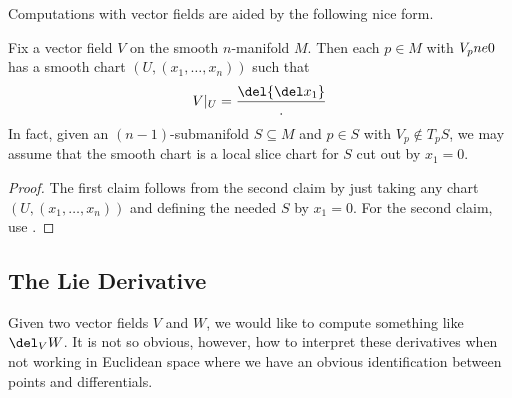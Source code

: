 \documentclass[../notes.tex]{subfiles}
\begin{document}
Computations with vector fields are aided by the following nice form.
\begin{lemma} \label{lem:get-vector-field-form}
	Fix a vector field $V$ on the smooth $n$-manifold $M$. Then each $p\in M$ with $V_p\\ne0$ has a smooth chart $(U,(x_1,\ldots,x_n))$ such that
	\[V|_U=\frac\del{\del x_1}.\]
	In fact, given an $(n-1)$-submanifold $S\subseteq M$ and $p\in S$ with $V_p\notin T_pS$, we may assume that the smooth chart is a local slice chart for $S$ cut out by $x_1=0$.
\end{lemma}
\begin{proof}
	The first claim follows from the second claim by just taking any chart $(U,(x_1,\ldots,x_n))$ and defining the needed $S$ by $x_1=0$. For the second claim, use .
\end{proof}

\subsection{The Lie Derivative}
Given two vector fields $V$ and $W$, we would like to compute something like $\del_VW$. It is not so obvious, however, how to interpret these derivatives when not working in Euclidean space where we have an obvious identification between points and differentials.
\end{document}
